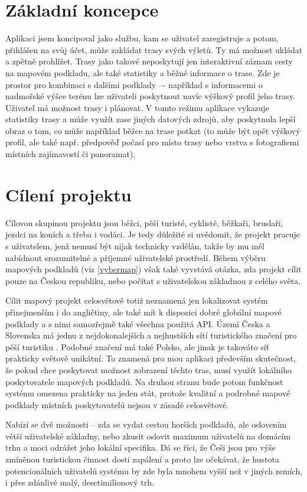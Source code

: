 \section{Základní koncepce}
Aplikaci jsem koncipoval jako službu, kam se uživatel zaregistruje a
potom, přihlášen na svůj účet, může zakládat trasy svých výletů. Ty má
možnost ukládat a zpětně prohlížet. Trasy jako takové neposkytují jen
interaktivní záznam cesty na mapovém podkladu, ale také statistiky a
běžné informace o trase. Zde je prostor pro kombinaci s dalšími
podklady –- například s informacemi o nadmořské výšce terénu lze
uživateli poskytnout navíc výškový profil jeho trasy. Uživatel má
možnost trasy i plánovat. V tomto režimu aplikace vykazuje statistiky
trasy a může využít zase jiných datových zdrojů, aby poskytnula lepší
obraz o tom, co může například běžce na trase potkat (to může být
opět výškový profil, ale také např. předpověď počasí pro místo trasy
nebo vrstva s fotografiemi místních zajímavostí či panoramat).

\section{Cílení projektu}
Cílovou skupinou projektu jsou běžci, pěší turisté, cyklisté,
běžkaři, bruslaři, jezdci na koních a třeba i vodáci. Je tedy
důležité si uvědomit, že projekt pracuje s uživatelem, jenž nemusí
být nijak technicky vzdělán, takže by mu měl nabídnout srozumitelné a
příjemné uživatelské prostředí. Během výběru mapových podkladů (viz
\ref{vybermap}) však také vyvstává otázka, zda projekt cílit pouze na
Českou republiku, nebo počítat s uživatelskou základnou z celého světa.

Cílit mapový projekt celosvětově totiž neznamená jen lokalizovat
systém přinej\-menším i do angličtiny, ale také mít k dispozici dobré
globální mapové podklady a s nimi samozřejmě také všechna použitá
API. Území Česka a Slovenska má jednu z nej\-dokonalejších a nej\-hustších
sítí turistického značení pro pěší turistiku \cite{kct}.
Podobné značení má také Polsko, ale jinak je takováto síť prakticky světově unikátní. To
znamená pro mou aplikaci především skutečnost, že pokud chce
poskytovat možnost zobrazení těchto tras, musí využít lokálního
poskytovatele mapových podkladů. Na druhou stranu bude potom
funkčnost systému omezena prakticky na jeden stát, protože kvalitní a
podrobné mapové podklady místních poskytovatelů nejsou v zásadě
celosvětové.

Nabízí se dvě možnosti -- zda se vydat cestou horších podkladů, ale
oslovením větší uživatelské základny, nebo zkusit oslovit maximum
uživatelů na domácím trhu a moci odrážet jeho lokální specifika. Dá se
říci, že Češi jsou pro výše zmíněnou turistickou činnost dosti
zapálení \cite{turistika} a proto lze očekávat, že hustota
potencionálních uživatelů systému by zde byla mnohem vyšší než v
jiných zemích, i přes zdánlivě malý, desetimilionový trh.

